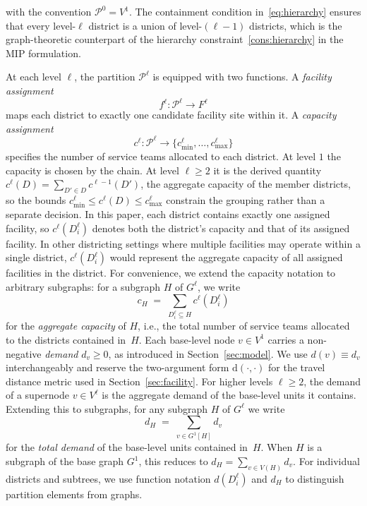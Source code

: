\documentclass[preprint,12pt,authoryear]{elsarticle}
\theoremstyle{definition}
\begin{document}



\noindent with the convention $\mathcal{P}^0 = V^1$. The containment condition
in~\eqref{eq:hierarchy} ensures that every level-$\ell$ district is a union of
level-$(\ell{-}1)$ districts, which is the graph-theoretic counterpart of the
hierarchy constraint~\eqref{cons:hierarchy} in the MIP formulation.

At each level $\ell$, the partition $\mathcal{P}^\ell$ is equipped with two
functions. A \emph{facility assignment}
%
\[
    f^\ell \colon \mathcal{P}^\ell \to F^\ell
\]
%
maps each district to exactly one candidate facility site within it. A
\emph{capacity assignment}
%
\[
    c^\ell \colon \mathcal{P}^\ell \to \{c^{\ell}_{\min}, \ldots, c^{\ell}_{\max}\}
\]
%
specifies the number of service teams allocated to each district. At level $1$ the capacity is chosen by the chain. At level $\ell \geq 2$ it is the derived quantity $c^\ell(D) = \sum_{D' \in D} c^{\ell-1}(D')$, the aggregate capacity of the member districts, so the bounds $c^\ell_{\min} \leq c^\ell(D) \leq c^\ell_{\max}$ constrain the grouping rather than a separate decision.  In this paper, each district contains exactly one assigned facility, so $c^\ell(D_i^\ell)$ denotes both the district's capacity and that of its assigned facility.  In
other districting settings where multiple facilities may operate within a single district, $c^\ell(D_i^\ell)$ would represent the aggregate capacity of all assigned facilities in the district.  For convenience, we extend the capacity notation to arbitrary subgraphs: for a subgraph $H$ of $G^\ell$, we write
%
\[
    c_H \;=\; \sum_{D_i^\ell \subseteq H} c^\ell(D_i^\ell)
\]
%
for the \emph{aggregate capacity} of $H$, i.e., the total number of service teams allocated to the districts contained in~$H$.
Each base-level node $v \in V^1$ carries a non-negative \emph{demand}
$d_v \geq 0$, as introduced in Section~\ref{sec:model}. We use $d(v) \equiv d_v$ interchangeably and reserve the two-argument form $\mathrm{d}(\cdot, \cdot)$ for the travel distance metric used in Section~\ref{sec:facility}.
For higher levels $\ell \geq 2$, the demand of a supernode $v \in V^\ell$
is the aggregate demand of the base-level units it contains.
Extending this to subgraphs, for any
subgraph $H$ of $G^\ell$ we write
%
\[
    d_H \;=\; \sum_{v \in G^1[H]} d_v
\]
%
for the \emph{total demand} of the base-level units contained in~$H$.  When
$H$ is a subgraph of the base graph $G^1$, this reduces to
$d_H = \sum_{v \in V(H)} d_v$.  For individual districts and subtrees, we
use function notation $d(D_i^\ell)$ and $d_H$ to distinguish partition
elements from graphs.
\end{document}
